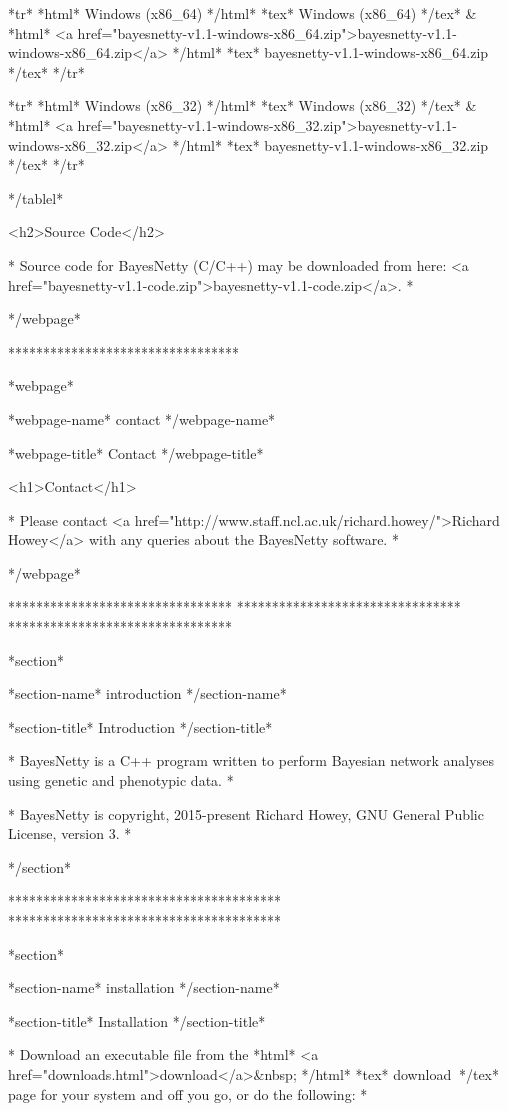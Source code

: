 *tr* *html* Windows (x86_64) */html* *tex* Windows (x86\_64) */tex* & *html* <a href="bayesnetty-v1.1-windows-x86_64.zip">bayesnetty-v1.1-windows-x86_64.zip</a> */html* *tex* bayesnetty-v1.1-windows-x86\_64.zip */tex* */tr*

*tr* *html* Windows (x86_32) */html* *tex* Windows (x86\_32) */tex* & *html* <a href="bayesnetty-v1.1-windows-x86_32.zip">bayesnetty-v1.1-windows-x86_32.zip</a> */html* *tex* bayesnetty-v1.1-windows-x86\_32.zip */tex* */tr*

*/tablel*

<h2>Source Code</h2>

* Source code for BayesNetty (C/C++) may be downloaded from here: <a href="bayesnetty-v1.1-code.zip">bayesnetty-v1.1-code.zip</a>. *


*/webpage*

*********************************

*webpage*

*webpage-name* contact */webpage-name*

*webpage-title* Contact */webpage-title*

<h1>Contact</h1>

 * Please contact <a href="http://www.staff.ncl.ac.uk/richard.howey/">Richard Howey</a> with any queries about the BayesNetty software. *


*/webpage*

******************************** ******************************** ********************************

*section*

*section-name* introduction */section-name*

*section-title* Introduction */section-title*

* BayesNetty is a C++ program written to perform Bayesian network analyses using genetic and phenotypic data. *

* BayesNetty is copyright, 2015-present Richard Howey, GNU General Public License, version 3. *


*/section*

*************************************** ***************************************

*section*

*section-name* installation */section-name*

*section-title* Installation */section-title*

* Download an executable file from the *html* <a href="downloads.html">download</a>&nbsp; */html* *tex* download$\:$ */tex* page for your system and off you go, or do the following: *

